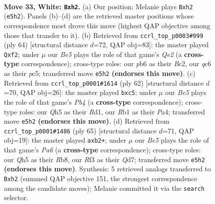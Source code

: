 \documentclass[11pt]{article}
\begin{document}
\clearpage

\begin{figure}[p]\centering
\begin{subfigure}{0.46\textwidth}\centering
\resizebox{\linewidth}{!}{%
\newchessgame
\chessboard[
  setfen={3r1rk1/7n/1pq5/p1p1Bp1Q/2P5/1P3R2/P2P3p/1R4K1 w - - 0 33},
  showmover=false,
  pgfstyle=straightmove, color=movearrow, markmove={e5-h2}
]}
\caption{}
\end{subfigure}\hfill
\begin{subfigure}{0.46\textwidth}\centering
\resizebox{\linewidth}{!}{%
\newchessgame
\chessboard[
  setfen={r4r1k/pR5n/P2p3p/2pPpPq1/8/3P4/2B1QpP1/4R1K1 w - - 0 33},
  showmover=false,
  pgfstyle=straightmove, color=movearrow, markmove={e2-f2}
]}
\caption{}
\end{subfigure}
\\[4pt]
\begin{subfigure}{0.46\textwidth}\centering
\resizebox{\linewidth}{!}{%
\newchessgame
\chessboard[
  setfen={4rrk1/6pp/4q3/2n1p2Q/PP1p4/6PP/6P1/3RR1K1 w - - 0 32},
  showmover=false,
  pgfstyle=straightmove, color=movearrow, markmove={b4-c5}
]}
\caption{}
\end{subfigure}\hfill
\begin{subfigure}{0.46\textwidth}\centering
\resizebox{\linewidth}{!}{%
\newchessgame
\chessboard[
  setfen={1r3r1k/p2q4/4N2b/5p1P/2pP1P2/p7/1P2Q3/K2R2R1 b - - 1 33},
  showmover=false,
  pgfstyle=straightmove, color=movearrow, markmove={a3-b2}
]}
\caption{}
\end{subfigure}
\caption{\textbf{Move 33, White: \texttt{Bxh2}.} (a) Our position; Melanie plays \texttt{Bxh2} (\texttt{e5h2}). Panels (b)--(d) are the retrieved master positions whose correspondence most drove this move (highest QAP objective among those that transfer to it). (b) Retrieved from \texttt{ccrl\_top\_p0003\#999} (ply 64) [structural distance $d$=72, QAP obj=83]: the master played \texttt{Qxf2}; under $\mu$ our \emph{Be5} plays the role of that game's \emph{Qe2} (a \textbf{cross-type} correspondence); cross-type roles: our \emph{p}b6 as their \emph{B}c2, our \emph{q}c6 as their \emph{p}c5; transferred move \texttt{e5h2} \textbf{(endorses this move)}. (c) Retrieved from \texttt{ccrl\_top\_p0001\#1614} (ply 62) [structural distance $d$=70, QAP obj=26]: the master played \texttt{bxc5}; under $\mu$ our \emph{Be5} plays the role of that game's \emph{Pb4} (a \textbf{cross-type} correspondence); cross-type roles: our \emph{Q}h5 as their \emph{R}d1, our \emph{R}b1 as their \emph{P}a4; transferred move \texttt{e5h2} \textbf{(endorses this move)}. (d) Retrieved from \texttt{ccrl\_top\_p0001\#1486} (ply 65) [structural distance $d$=71, QAP obj=19]: the master played \texttt{axb2+}; under $\mu$ our \emph{Be5} plays the role of that game's \emph{Pa6} (a \textbf{cross-type} correspondence); cross-type roles: our \emph{Q}h5 as their \emph{R}b8, our \emph{R}f3 as their \emph{Q}d7; transferred move \texttt{e5h2} \textbf{(endorses this move)}. Synthesis: 5 retrieved analogs transferred to \texttt{Bxh2} (summed QAP objective 151, the strongest correspondence among the candidate moves); Melanie committed it via the \texttt{search} selector.}
\label{fig:thought-m64}
\end{figure}
\end{document}
